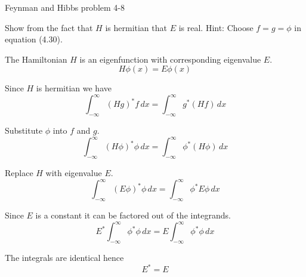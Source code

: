 \documentclass[12pt]{article}
\begin{document}
\begin{center}
Feynman and Hibbs problem 4-8
\end{center}

Show from the fact that $H$ is hermitian that $E$ is real.
Hint: Choose $f=g=\phi$ in equation (4.30).

\bigskip
The Hamiltonian $H$ is an eigenfunction with corresponding eigenvalue $E$.
\begin{equation*}
H\phi(x)=E\phi(x)
\tag{4.42}
\end{equation*}

Since $H$ is hermitian we have
\begin{equation*}
\int_{-\infty}^\infty(Hg)^*f\,dx=\int_{-\infty}^\infty g^*(Hf)\,dx
\tag{4.30}
\end{equation*}

Substitute $\phi$ into $f$ and $g$.
\begin{equation*}
\int_{-\infty}^\infty(H\phi)^*\phi\,dx=\int_{-\infty}^\infty \phi^*(H\phi)\,dx
\end{equation*}

Replace $H$ with eigenvalue $E$.
\begin{equation*}
\int_{-\infty}^\infty (E\phi)^*\phi\,dx=\int_{-\infty}^\infty \phi^*E\phi\,dx
\end{equation*}

Since $E$ is a constant it can be factored out of the integrands.
\begin{equation*}
E^*\int_{-\infty}^\infty\phi^*\phi\,dx=E\int_{-\infty}^\infty \phi^*\phi\,dx
\end{equation*}

The integrals are identical hence
\begin{equation*}
E^*=E
\end{equation*}
\end{document}
